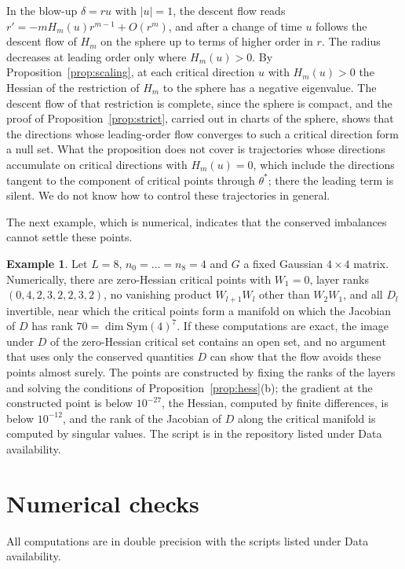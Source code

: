 \documentclass[11pt]{amsart}
\theoremstyle{definition}
\newtheorem{example}[theorem]{Example}
\theoremstyle{remark}
\numberwithin{equation}{section}
\begin{document}
In the blow-up $\delta=ru$ with $|u|=1$, the descent flow reads $r'=-mH_m(u)r^{m-1}+O(r^m)$, and after a change of time $u$ follows the descent flow of $H_m$ on the sphere up to terms of higher order in $r$. The radius decreases at leading order only where $H_m(u)>0$. By Proposition~\ref{prop:scaling}, at each critical direction $u$ with $H_m(u)>0$ the Hessian of the restriction of $H_m$ to the sphere has a negative eigenvalue. The descent flow of that restriction is complete, since the sphere is compact, and the proof of Proposition~\ref{prop:strict}, carried out in charts of the sphere, shows that the directions whose leading-order flow converges to such a critical direction form a null set. What the proposition does not cover is trajectories whose directions accumulate on critical directions with $H_m(u)=0$, which include the directions tangent to the component of critical points through $\theta^*$; there the leading term is silent. We do not know how to control these trajectories in general.

The next example, which is numerical, indicates that the conserved imbalances cannot settle these points.

\begin{example}\label{ex:L8}
Let $L=8$, $n_0=\dots=n_8=4$ and $G$ a fixed Gaussian $4\times4$ matrix. Numerically, there are zero-Hessian critical points with $W_1=0$, layer ranks $(0,4,2,3,2,2,3,2)$, no vanishing product $W_{l+1}W_l$ other than $W_2W_1$, and all $D_l$ invertible, near which the critical points form a manifold on which the Jacobian of $D$ has rank $70=\dim\mathrm{Sym}(4)^7$. If these computations are exact, the image under $D$ of the zero-Hessian critical set contains an open set, and no argument that uses only the conserved quantities $D$ can show that the flow avoids these points almost surely. The points are constructed by fixing the ranks of the layers and solving the conditions of Proposition~\ref{prop:hess}(b); the gradient at the constructed point is below $10^{-27}$, the Hessian, computed by finite differences, is below $10^{-12}$, and the rank of the Jacobian of $D$ along the critical manifold is computed by singular values. The script is in the repository listed under Data availability.
\end{example}

\section{Numerical checks}\label{sec:numerics}
All computations are in double precision with the scripts listed under Data availability.
\end{document}
